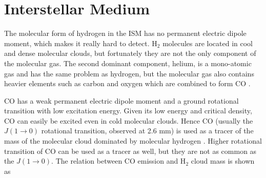 \documentclass[useAMS,usenatbib]{mn2e}
\begin{document}
\section{Interstellar Medium}


 The molecular form of hydrogen in the ISM has no permanent electric dipole moment, which makes it really hard to detect. H$_2$ molecules are located in cool and dense molecular clouds, but fortunately they are not the only component of the molecular gas. The second dominant component, helium, is a mono-atomic gas and has the same problem as hydrogen, but the molecular gas also contains heavier elements such as carbon and oxygen which are combined to form CO \citep{Bolato13}.

CO has a weak permanent electric dipole moment and a ground rotational transition with low excitation energy. Given its low energy and critical density, CO can easily be excited even in cold molecular clouds. Hence CO (usually the $J(1\rightarrow 0)$ rotational transition, observed at 2.6 mm) is used as a tracer of the mass of the molecular cloud dominated by molecular hydrogen \citep[see, for example,][] {Sanders84}. Higher rotational transition of CO can be used as a tracer as well, but they are not as common as the $J(1\rightarrow 0)$. The relation between CO emission and H$_2$ cloud mass is shown as
\end{document}
